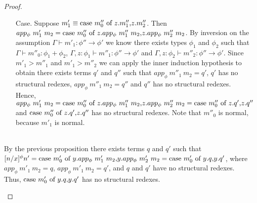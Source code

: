 \begin{proof}
\begin{itemize}
\begin{itemize}
  \item[Case.] Suppose $m'_1 \equiv \mbox{case}\ m''_0\ \text{of}\ z\text{.}m''_1\text{,}z\text{.}m''_2$.  Then\\
    $app_\phi\ m'_1\ m_2 = \mbox{case}\ m''_0\ \text{of}\ z\text{.}app_\phi\ m''_1\ m_2\text{,}z\text{.}app_\phi\ m''_2\ m_2$.  By inversion on the assumption
    $\Gamma \vdash m'_1:\phi''\to\phi'$ we know there exists types $\phi_1$ and $\phi_2$ such that
    $\Gamma \vdash m''_0:\phi_1+\phi_2$, $\Gamma,z:\phi_1 \vdash m''_1:\phi''\to\phi'$
    and $\Gamma,z:\phi_2 \vdash m''_2:\phi''\to\phi'$.  Since $m'_1 > m''_1$ and $m'_1 > m''_2$ we can 
    apply the inner induction hypothesis to obtain there exists terms $q'$ and $q''$ such that 
    $app_\phi\ m''_1\ m_2 = q'$, $q'$ has no structural redexes, $app_\phi\ m''_1\ m_2 = q''$ and $q''$ has no structural redexes.  
    Hence, 
    $app_\phi\ m'_1\ m_2 = \ccon{m''_0}{z}{app_\phi\ m''_1\ m_2}{app_\phi\ m''_2\ m_2} = \ccon{m''_0}{z}{q'}{q''}$ and
    $\mbox{case}\ m''_0\ \text{of}\ z\text{.}q'\text{,}z\text{.}q''$ has no structural redexes.  Note that $m''_0$ is normal, because $m'_1$ is
    normal.  
  \end{itemize}

  
  \ \\
  By the previous proposition there exists terms $q$ and $q'$ such that \\
  $[n/x]^\phi n' = \ccon{m'_0}{y}{app_\phi\ m'_1\ m_2}{app_\phi\ m'_2\ m_2}
  = \ccon{m'_0}{y}{q}{q'}$, where $app_\phi\ m'_1\ m_2 = q$, $app_\phi\ m'_1\ m_2 = q'$, and
  $q$ and $q'$ have no structural redexes.  Thus, $\mbox{case}\ m'_0\ \text{of}\ y\text{.}q\text{,}y\text{.}q'$ has no
  structural redexes.  
  

\end{itemize}
\end{proof}
